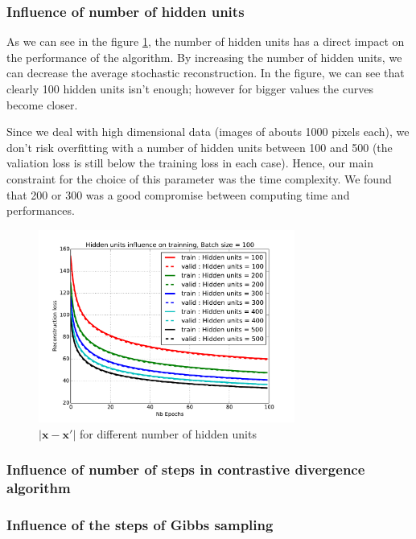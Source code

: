 \documentclass{article}
\begin{document}
\subsubsection{Influence of number of hidden units}

As we can see in the figure \ref{fig:hidden}, the number of hidden units has a direct impact on the performance of the algorithm. By increasing the number of hidden units, we can decrease the average stochastic reconstruction. In the figure, we can see that clearly 100 hidden units isn't enough; however for bigger values the curves become closer. 

Since we deal with high dimensional data (images of abouts 1000 pixels each), we don't risk overfitting with a number of hidden units between 100 and 500 (the valiation loss is still below the training loss in each case). Hence, our main constraint for the choice of this parameter was the time complexity. We found that 200 or 300 was a good compromise between computing time and performances.

\begin{figure}
\centering
\includegraphics[width=0.75\textwidth]{hidden_units}
\caption{$\lvert \mathbf{x} - \mathbf{x'} \rvert$ for different number of hidden units}
\label{fig:hidden}
\end{figure}


\subsubsection{Influence of number of steps in contrastive divergence algorithm}
\label{subsubsec:CDk}

\subsubsection{Influence of the steps of Gibbs sampling}
\end{document}
